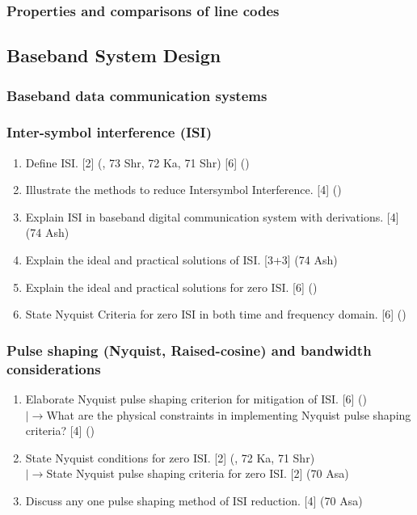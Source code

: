 \documentclass[12pt]{article}
\newcommand{\lb}{\\$\left|\rightarrow\right.$}
\begin{document}
    \subsubsection{Properties and comparisons of line codes}
  \subsection{Baseband System Design}
    \subsubsection{Baseband data communication systems}
    \subsubsection{Inter-symbol interference (ISI)}
    	\begin{enumerate}
    		\item Define ISI. \hfill [2] (, 73 Shr, 72 Ka, 71 Shr) [6] ()
    		
    		\item Illustrate the methods to reduce Intersymbol Interference. \hfill [4] ()
    		
    		\item Explain ISI in baseband digital communication system with derivations. \hfill [4] (74 Ash)
    		
    		\item Explain the ideal and practical solutions of ISI. \hfill [3+3] (74 Ash)
    		
    		\item Explain the ideal and practical solutions for zero ISI. \hfill [6] ()
    		
    		\item State Nyquist Criteria for zero ISI in both time and frequency domain. \hfill [6] ()
    	\end{enumerate}
    
    \subsubsection{Pulse shaping (Nyquist, Raised-cosine) and bandwidth considerations}
    	\begin{enumerate}
    		\item Elaborate Nyquist pulse shaping criterion for mitigation of ISI. \hfill [6] ()
    		\lb What are the physical constraints in implementing Nyquist pulse shaping criteria? \hfill [4] ()
    		
    		\item State Nyquist conditions for zero ISI. \hfill [2] (, 72 Ka, 71 Shr)
    		\lb State Nyquist pulse shaping criteria for zero ISI. \hfill [2] (70 Asa)
    		
    		\item Discuss any one pulse shaping method of ISI reduction. \hfill [4] (70 Asa)
    	\end{enumerate}
    
\end{document}
